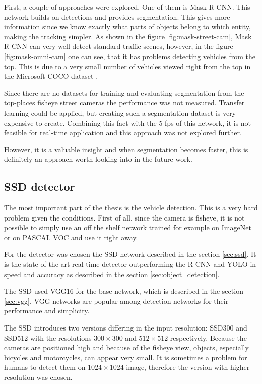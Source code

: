 \documentclass[a4paper,11pt,titlepage,twoside]{article}
\numberwithin{figure}{section}
\begin{document}
First, a couple of approaches were explored. One of them is Mask R-CNN\cite{he2017mask}. This network builds on detections and provides segmentation. This gives more information since we know exactly what parts of objects belong to which entity, making the tracking simpler. As shown in the figure \ref{fig:mask-street-cam}, Mask R-CNN can very well detect standard traffic scenes, however, in the figure \ref{fig:mask-omni-cam}  one can see, that it has problems detecting vehicles from the top. This is due to a very small number of vehicles viewed right from the top in the Microsoft COCO dataset \cite{lin2014microsoft}. 

Since there are no datasets for training and evaluating segmentation from the top-places fisheye street cameras the performance was not measured. Transfer learning could be applied, but creating such a segmentation dataset is very expensive to create. Combining this fact with the 5 fps of this network, it is not feasible for real-time application and this approach was not explored further. 

However, it is a valuable insight and when segmentation becomes faster, this is definitely an approach worth looking into in the future work.

\subsection{SSD detector}
\label{sec:ssd-implementation}
The most important part of the thesis is the vehicle detection. This is a very hard problem given the conditions. First of all, since the camera is fisheye, it is not possible to simply use an off the shelf network trained for example on ImageNet or on PASCAL VOC and use it right away. 

For the detector was chosen the SSD network \cite{liu2016ssd} described in the section \ref{sec:ssd}. It is the state of the art real-time detector outperforming the R-CNN\cite{faster-rcnn} and YOLO\cite{redmon2016you} in speed and accuracy as described in the section \ref{sec:object_detection}. 

The SSD used VGG16 for the base network, which is described in the section \ref{sec:vgg}. VGG networks are popular among detection networks for their performance and simplicity. 

The SSD introduces two versions differing in the input resolution: SSD300 and SSD512 with the resolutions $300 \times 300$ and $512 \times 512$ respectively. Because the cameras are positioned high and because of the fisheye view, objects, especially bicycles and motorcycles, can appear very small. It is sometimes a problem for humans to detect them on $1024 \times 1024$ image, therefore the version with higher resolution was chosen. 
\end{document}
